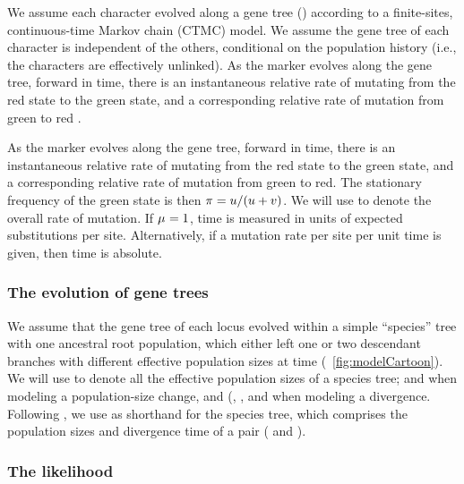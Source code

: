 We assume each character evolved along a gene tree (\genetree)
according to a finite-sites, continuous-time Markov chain (CTMC) model.
We assume the gene tree of each character is independent of the others,
conditional on the population history (i.e., the characters are effectively
unlinked).
As the marker evolves along the gene tree, forward in time, there is an
instantaneous relative rate \rgmurate of mutating from the red state to the
green state, and a corresponding relative rate \grmurate of mutation from
green to red \citep{Bryant2012,Oaks2018ecoevolity}.

As the marker evolves along the gene tree, forward in time, there is an
instantaneous relative rate \rgmurate of mutating from the red state to the
green state, and a corresponding relative rate \grmurate of mutation from green
to red.
The stationary frequency of the green state is then
$\pi_{} = u / (u + v)$.
We will use \murate to denote the overall rate of mutation.
If $\mu_{} = 1$, time is measured in
units of expected substitutions per site.
Alternatively, if a mutation rate per site per unit time is given, then time is
absolute.

\subsubsection{The evolution of gene trees}

We assume that the gene tree of each locus evolved within a simple
``species'' tree with one ancestral root population, which either
left one or two descendant branches with different effective population sizes
at time \comparisondivtime
(\fig{}~\ref{fig:modelCartoon}).
We will use
\comparisonpopsizes{}
to denote all the effective population sizes of a species tree;
\epopsize[\rootpopindex] and 
\epopsize[\descendantpopindex{1}] when modeling a population-size change, and
(\epopsize[\rootpopindex],
\epopsize[\descendantpopindex{1}],
and \epopsize[\descendantpopindex{2}] when modeling a divergence.
Following \citet{Oaks2018ecoevolity}, we use
\sptree{}
as shorthand for the species tree, which comprises the population sizes and
divergence time of a pair
(\comparisonpopsizes{} and \comparisondivtime{}).


\subsubsection{The likelihood}

